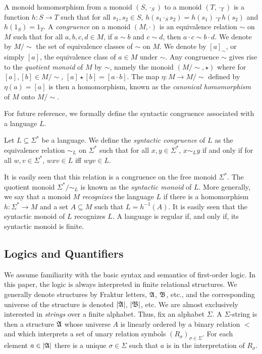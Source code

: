 \documentclass[a4paper,UKenglish,cleveref, autoref, thm-restate, anonymous]{lipics-v2021}
\begin{document}
A monoid homomorphism from a monoid $(S, \cdot_S)$ to a monoid $(T, \cdot_T)$ is a function $h : S \rightarrow T$ such that for all $s_1, s_2 \in S$, $h(s_1 \cdot_S s_2) = h(s_1) \cdot_T h(s_2)$ and $h(1_S) = 1_T$.     A \emph{congruence} on a monoid $(M, \cdot)$ is an equivalence relation $\sim$ on $M$ such that for all $a,b,c,d \in M$, if $a \sim b$ and $c \sim d$, then $a \cdot c \sim b \cdot d$.  We denote by $M/{\sim}$ the set of equivalence classes of $\sim$ on $M$.  We denote by $[a]_{\sim}$, or simply $[a]$, the equivalence class of $a \in M$ under $\sim$.  Any congruence $\sim$ gives rise to the \emph{quotient monoid} of $M$ by $\sim$, namely the monoid $(M/{\sim}, \star)$ where for $[a],[b] \in M/{\sim}$, $[a] \star [b] = [a \cdot b]$.  The map $\eta : M \rightarrow M/{\sim}$ defined by $\eta(a) = [a]$ is then a homomorphism, known as the  \emph{canonical homomorphism} of $M$ onto $M/{\sim}$.

For future reference, we formally define the syntactic congruence associated with a language $L$.
\begin{definition}\label{def:syncong}
  Let $L \subseteq \Sigma^*$ be a language. We define the \emph{syntactic congruence} of $L$ as the equivalence relation $\sim_L$ on $\Sigma^*$ such that for all $x, y \in \Sigma^*$, $x \sim_L y$ if and only if for all $w,v \in \Sigma^*$, $wxv \in L$ iff $wyv \in L$.
  \end{definition}
 It is easily seen that this relation is a congruence on the free monoid $\Sigma^*$.  The quotient monoid $\Sigma^*/{\sim_L}$ is known as the \emph{syntactic monoid} of $L$.  More generally, we say that a monoid $M$ \emph{recognizes} the language $L$ if there is a homomorphism $h: \Sigma^* \rightarrow M$ and a set $A \subseteq M$ such that $L = h^{-1}(A)$.  It is easily seen that the syntactic monoid of $L$ recognizes $L$.  A language is regular if, and only if, its syntactic monoid is finite.

\subsection{Logics and Quantifiers}\label{sec:backgroundmult}

We assume familiarity with the basic syntax and semantics of first-order logic.  In this paper, the logic is always interpreted in finite relational structures.  We generally denote structures by Fraktur letters, $\mathfrak{A}$, $\mathfrak{B}$, etc., and the corresponding universe of the structure is denoted $|\mathfrak{A}|$, $|\mathfrak{B}|$, etc.
We are almost exclusively interested in \emph{strings} over a finite alphabet.  Thus, fix an alphabet $\Sigma$.  A $\Sigma$-string is then a structure $\mathfrak{A}$ whose universe $A$ is linearly ordered by a binary relation $<$ and which interprets a set of unary relation symbols $(R_{\sigma})_{\sigma \in \Sigma}$.  For each element $a \in |\mathfrak{A}|$ there is a unique $\sigma \in \Sigma$ such that $a$ is in the interpretation of $R_{\sigma}$.
\end{document}
